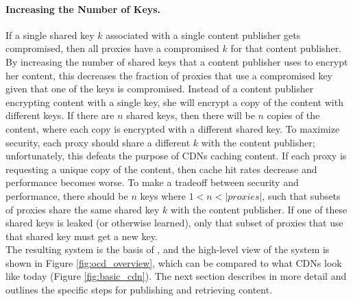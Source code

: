 \paragraph{Increasing the Number of Keys.} If a single shared key $k$ associated with a single content publisher gets 
compromised, then all proxies have a compromised $k$ for that content publisher.  By increasing the number of shared 
keys that a content publisher uses to encrypt her content, this decreases the fraction of proxies that use a 
compromised key given that one of the keys is compromised.  Instead of a content publisher encrypting content with a 
single key, she will encrypt a copy of the content with different keys.  If there are $n$ shared keys, then there 
will be $n$ copies of the content, where each copy is encrypted with a different shared key.  To maximize security, each proxy should share a
different $k$ with the content publisher; unfortunately, this defeats the purpose of CDNs caching content.  If each 
proxy is requesting a unique copy of the content, then cache hit rates decrease and performance becomes worse.  To make 
a tradeoff between security and performance, there should be $n$ keys where $1 < n < |proxies|$, such that subsets of 
proxies share the same shared key $k$ with the content publisher.  If one of these shared keys is leaked (or otherwise learned), only that 
subset of proxies that use that shared key must get a new key.  \\

The resulting system is the basis of \system{}, and the high-level view of the system is shown in Figure \ref{fig:ocd_overview}, 
which can be compared to what CDNs look like today (Figure \ref{fig:basic_cdn}).  The next section describes \system{} in more 
detail and outlines the specific steps for publishing and retrieving content.

